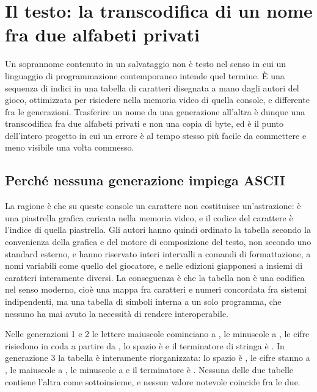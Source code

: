 
\chapter{Il testo: la transcodifica di un nome fra due alfabeti privati}
\label{cap:testo}

Un soprannome contenuto in un salvataggio non è testo nel senso in cui un linguaggio di programmazione contemporaneo intende quel termine. È una sequenza di indici in una tabella di caratteri disegnata a mano dagli autori del gioco, ottimizzata per risiedere nella memoria video di quella console, e differente fra le generazioni. Trasferire un nome da una generazione all'altra è dunque una transcodifica fra due alfabeti privati e non una copia di byte, ed è il punto dell'intero progetto in cui un errore è al tempo stesso più facile da commettere e meno visibile una volta commesso.

\section{Perché nessuna generazione impiega ASCII}

La ragione è che su queste console un carattere non costituisce un'astrazione: è una piastrella grafica caricata nella memoria video, e il codice del carattere è l'indice di quella piastrella. Gli autori hanno quindi ordinato la tabella secondo la convenienza della grafica e del motore di composizione del testo, non secondo uno standard esterno, e hanno riservato interi intervalli a comandi di formattazione, a nomi variabili come quello del giocatore, e nelle edizioni giapponesi a insiemi di caratteri interamente diversi. La conseguenza è che la tabella non è una codifica nel senso moderno, cioè una mappa fra caratteri e numeri concordata fra sistemi indipendenti, ma una tabella di simboli interna a un solo programma, che nessuno ha mai avuto la necessità di rendere interoperabile.

Nelle generazioni 1 e 2 le lettere maiuscole cominciano a , le minuscole a , le cifre risiedono in coda a partire da , lo spazio è  e il terminatore di stringa è  \cite{pokered}. In generazione 3 la tabella è interamente riorganizzata: lo spazio è , le cifre stanno a , le maiuscole a , le minuscole a  e il terminatore è  \cite{pokeemerald}. Nessuna delle due tabelle contiene l'altra come sottoinsieme, e nessun valore notevole coincide fra le due.

